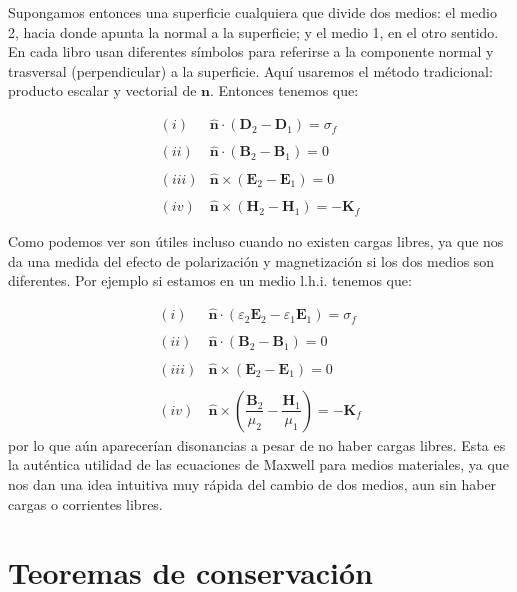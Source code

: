 \documentclass[12pt,a4paper]{article}
\newcommand{\parentesis}[1]{\left( #1  \right)}
\newcommand{\Bn}{\mathbf{B}}
\newcommand{\En}{\mathbf{E}}
\newcommand{\Dn}{\mathbf{D}}
\newcommand{\Hn}{\mathbf{H}}
\newcommand{\Kn}{\mathbf{K}}
\newcommand{\nn}{\mathbf{n}}
\newcommand{\hnn}{\hat{\mathbf{n}}}
\numberwithin{equation}{section}
\numberwithin{figure}{section}
\begin{document}
Supongamos entonces una superficie cualquiera que divide dos medios: el medio 2, hacia donde apunta la normal a la superficie; y el medio 1, en el otro sentido. En cada libro usan diferentes símbolos para referirse a la componente normal y trasversal (perpendicular) a la superficie. Aquí usaremos el método tradicional: producto escalar y vectorial de $\nn$. Entonces tenemos que:


\begin{equation}
\begin{array}{rl}
(i) & \hnn \cdot (\Dn_2 - \Dn_1) = \sigma_f  \\ \\
(ii) & \hnn \cdot (\Bn_2 - \Bn_1) = 0   \\ \\
(iii) & \hnn \times ( \En_2 - \En_1) = 0 \\ \\
(iv) & \hnn \times (\Hn_2 - \Hn_1) = - \Kn_f
\end{array} \label{Ec:01.4.18}
\end{equation}

Como podemos ver son útiles incluso cuando no existen cargas libres, ya que nos da una medida del efecto de polarización y magnetización si los dos medios son diferentes. Por ejemplo si estamos en un medio l.h.i. tenemos que:



\begin{equation}
\begin{array}{rl}
(i) & \hnn \cdot (\varepsilon_2 \En_2 - \varepsilon_1 \En_1) = \sigma_f  \\ \\
(ii) & \hnn \cdot (\Bn_2 - \Bn_1) = 0   \\ \\
(iii) & \hnn \times ( \En_2 - \En_1) = 0 \\ \\
(iv) & \hnn \times \parentesis{\dfrac{\Bn_2}{\mu_2} - \dfrac{\Hn_1}{\mu_1}} = -  \Kn_f
\end{array} \label{Ec:01.4.18}
\end{equation}
por lo que aún aparecerían disonancias a pesar de no haber cargas libres. Esta es la auténtica utilidad de las ecuaciones de Maxwell para medios materiales, ya que nos dan una idea intuitiva muy rápida del cambio de dos medios, aun sin haber cargas o corrientes libres.




\newpage

\section{Teoremas de conservación}
\end{document}
